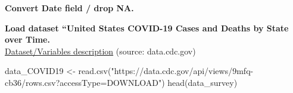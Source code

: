 \documentclass[
]{article}
\newenvironment{Shaded}{\begin{snugshade}}{\end{snugshade}}
\newcommand{\FunctionTok}[1]{\textcolor[rgb]{0.00,0.00,0.00}{#1}}
\newcommand{\NormalTok}[1]{#1}
\newcommand{\OtherTok}[1]{\textcolor[rgb]{0.56,0.35,0.01}{#1}}
\newcommand{\SpecialCharTok}[1]{\textcolor[rgb]{0.00,0.00,0.00}{#1}}
\newcommand{\StringTok}[1]{\textcolor[rgb]{0.31,0.60,0.02}{#1}}
\begin{document}
\textbf{Convert Date field / drop NA.}

\begin{Shaded}
\end{Shaded}

\textbf{Load dataset ``United States COVID-19 Cases and Deaths by State
over Time.}\\
\href{https://data.cdc.gov/Case-Surveillance/United-States-COVID-19-Cases-and-Deaths-by-State-o/9mfq-cb36}{Dataset/Variables
description} (source: data.cdc.gov)

\begin{Shaded}
\begin{Highlighting}[]
\NormalTok{data\_COVID19 }\OtherTok{\textless{}{-}} \FunctionTok{read.csv}\NormalTok{(}\StringTok{"https://data.cdc.gov/api/views/9mfq{-}cb36/rows.csv?accessType=DOWNLOAD"}\NormalTok{)}
\FunctionTok{head}\NormalTok{(data\_survey)}
\end{Highlighting}
\end{Shaded}
\end{document}
